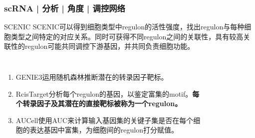 \documentclass[11pt]{ctexbeamer}
\begin{document}
\begin{frame}
	\frametitle{scRNA | 分析 | 角度 | 调控网络}
	\begin{block}{SCENIC}
		SCENIC可以得到细胞类型中regulon的活性强度，找出regulon与每种细胞类型之间特定的对应关系。同时可获得不同regulon之间的关联性，具有较高关联性的regulon可能共同调控下游基因，并共同负责细胞功能。
	\end{block}
\vspace{-0.3em}
\pause
    \begin{columns}
    	\begin{enumerate}
    		\item GENIE3运用随机森林推断潜在的转录因子靶标。
    		\item RcisTarget分析每个regulon的基因，以鉴定富集的motif。\textbf{每个转录因子及其潜在的直接靶标被称为一个regulon。}
    		\item AUCell使用AUC来计算输入基因集的关键子集是否在每个细胞的表达基因中富集，为细胞间的regulon打分赋值。
    		\end{enumerate}
\begin{figure}

\end{figure}
\end{columns}
\end{frame}
\end{document}
